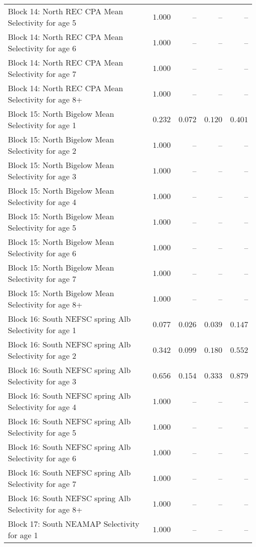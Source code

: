 \documentclass[
]{article}
\begin{document}
\begin{landscape}
\begin{longtable}[t]{lrrrr}
\addlinespace
Block 14: North REC CPA Mean Selectivity for age 5 & $1.000$ & -- & -- & --\\
Block 14: North REC CPA Mean Selectivity for age 6 & $1.000$ & -- & -- & --\\
Block 14: North REC CPA Mean Selectivity for age 7 & $1.000$ & -- & -- & --\\
Block 14: North REC CPA Mean Selectivity for age 8+ & $1.000$ & -- & -- & --\\
Block 15: North Bigelow Mean Selectivity for age 1 & $0.232$ & $0.072$ & $0.120$ & $0.401$\\
\addlinespace
Block 15: North Bigelow Mean Selectivity for age 2 & $1.000$ & -- & -- & --\\
Block 15: North Bigelow Mean Selectivity for age 3 & $1.000$ & -- & -- & --\\
Block 15: North Bigelow Mean Selectivity for age 4 & $1.000$ & -- & -- & --\\
Block 15: North Bigelow Mean Selectivity for age 5 & $1.000$ & -- & -- & --\\
Block 15: North Bigelow Mean Selectivity for age 6 & $1.000$ & -- & -- & --\\
\addlinespace
Block 15: North Bigelow Mean Selectivity for age 7 & $1.000$ & -- & -- & --\\
Block 15: North Bigelow Mean Selectivity for age 8+ & $1.000$ & -- & -- & --\\
Block 16: South NEFSC spring Alb Selectivity for age 1 & $0.077$ & $0.026$ & $0.039$ & $0.147$\\
Block 16: South NEFSC spring Alb Selectivity for age 2 & $0.342$ & $0.099$ & $0.180$ & $0.552$\\
Block 16: South NEFSC spring Alb Selectivity for age 3 & $0.656$ & $0.154$ & $0.333$ & $0.879$\\
\addlinespace
Block 16: South NEFSC spring Alb Selectivity for age 4 & $1.000$ & -- & -- & --\\
Block 16: South NEFSC spring Alb Selectivity for age 5 & $1.000$ & -- & -- & --\\
Block 16: South NEFSC spring Alb Selectivity for age 6 & $1.000$ & -- & -- & --\\
Block 16: South NEFSC spring Alb Selectivity for age 7 & $1.000$ & -- & -- & --\\
Block 16: South NEFSC spring Alb Selectivity for age 8+ & $1.000$ & -- & -- & --\\
\addlinespace
Block 17: South NEAMAP Selectivity for age 1 & $1.000$ & -- & -- & --\\

\end{longtable}
\end{landscape}
\end{document}
